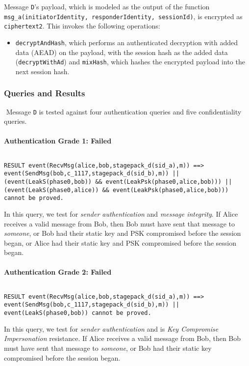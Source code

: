 Message \texttt{D}'s payload, which is modeled as the output of the function \texttt{msg\_a(initiatorIdentity, responderIdentity, sessionId)}, is encrypted as \texttt{ciphertext2}. This invokes the following operations:


\begin{itemize}

\item \texttt{decryptAndHash}, which performs an authenticated decryption with added data (AEAD) on the payload, with the session hash as the added data (\texttt{decryptWithAd}) and \texttt{mixHash}, which hashes the encrypted payload into the next session hash.

\end{itemize}
\subsubsection{Queries and Results}$ $
Message \texttt{D} is tested against four authentication queries and five confidentiality queries.
\paragraph{Authentication Grade 1: Failed}$ $
\begin{lstlisting}
RESULT event(RecvMsg(alice,bob,stagepack_d(sid_a),m)) ==> event(SendMsg(bob,c_1117,stagepack_d(sid_b),m)) || (event(LeakS(phase0,bob)) && event(LeakPsk(phase0,alice,bob))) || (event(LeakS(phase0,alice)) && event(LeakPsk(phase0,alice,bob))) cannot be proved.
\end{lstlisting}

In this query, we test for \emph{sender authentication} and \emph{message integrity}. If Alice receives a valid message from Bob, then Bob must have sent that message to \emph{someone}, or Bob had their static key and PSK compromised before the session began, or Alice had their static key and PSK compromised before the session began.


\paragraph{Authentication Grade 2: Failed}$ $
\begin{lstlisting}
RESULT event(RecvMsg(alice,bob,stagepack_d(sid_a),m)) ==> event(SendMsg(bob,c_1117,stagepack_d(sid_b),m)) || event(LeakS(phase0,bob)) cannot be proved.
\end{lstlisting}

In this query, we test for \emph{sender authentication} and is \emph{Key Compromise Impersonation} resistance. If Alice receives a valid message from Bob, then Bob must have sent that message to \emph{someone}, or Bob had their static key compromised before the session began.


